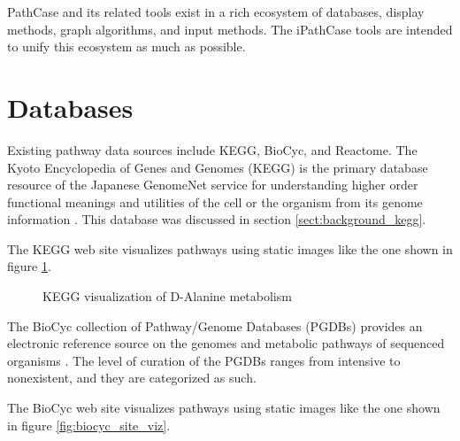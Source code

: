 PathCase and its related tools exist in a rich ecosystem of databases, display
methods, graph algorithms, and input methods. The iPathCase tools are intended
to unify this ecosystem as much as possible.

\section{Databases}

Existing pathway data sources include KEGG, BioCyc, and Reactome. The Kyoto
Encyclopedia of Genes and Genomes (KEGG) is the primary database resource of the
Japanese GenomeNet service for understanding higher order functional meanings
and utilities of the cell or the organism from its genome information
\cite{kegg-basic}. This database was discussed in section
\ref{sect:background_kegg}.

The KEGG web site visualizes pathways using static images like the one shown in
figure \ref{fig:kegg_site_viz}.

\begin{figure}[hbtp]
    \caption{\label{fig:kegg_site_viz} KEGG visualization of D-Alanine
    metabolism}
\end{figure}

The BioCyc collection of Pathway/Genome Databases (PGDBs) provides an electronic
reference source on the genomes and metabolic pathways of sequenced organisms
\cite{biocyc}. The level of curation of the PGDBs ranges from intensive to
nonexistent, and they are categorized as such.

The BioCyc web site visualizes pathways using static images like the one shown
in figure \ref{fig:biocyc_site_viz}.

